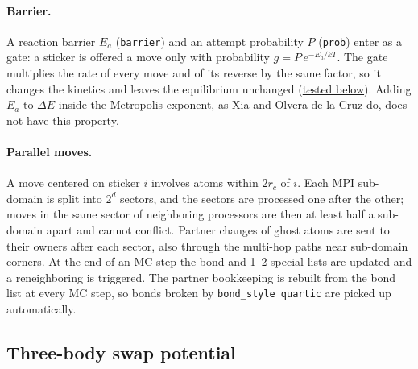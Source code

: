 \documentclass[a4paper]{tufte-handout}
\newcommand{\cmd}[1]{\texttt{#1}}
\begin{document}
\paragraph{Barrier.}
A reaction barrier $E_a$ (\cmd{barrier}) and an attempt probability $P$ (\cmd{prob}) enter as a
gate: a sticker is offered a move only with probability $g = P\,e^{-E_a/kT}$. The gate multiplies the
rate of every move and of its reverse by the same factor, so it changes the kinetics and leaves the
equilibrium unchanged (\hyperref[sec:rules]{tested below}). Adding $E_a$ to $\Delta E$ inside the
Metropolis exponent, as Xia and Olvera de la Cruz do,\cite{Xia2024b} does not have this property.

\paragraph{Parallel moves.}
A move centered on sticker $i$ involves atoms within $2r_c$ of $i$. Each MPI sub-domain is split
into $2^d$ sectors, and the sectors are processed one after the other; moves in the same sector of
neighboring processors are then at least half a sub-domain apart and cannot conflict. Partner
changes of ghost atoms are sent to their owners after each sector, also through the multi-hop paths
near sub-domain corners. At the end of an MC step the bond and 1--2 special lists are updated and a
reneighboring is triggered. The partner bookkeeping is rebuilt from the bond list at every MC step,
so bonds broken by \cmd{bond\_style quartic} are picked up automatically.

\subsection{Three-body swap potential}
\end{document}
